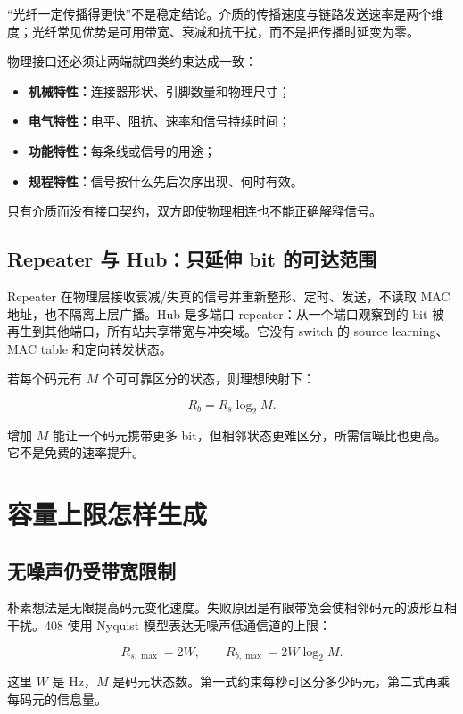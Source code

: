 \documentclass[UTF8,fontset=none,11pt,a4paper]{ctexart}
\providecommand{\tightlist}{\setlength{\itemsep}{0pt}\setlength{\parskip}{0pt}}
\begin{document}
“光纤一定传播得更快”不是稳定结论。介质的传播速度与链路发送速率是两个维度；光纤常见优势是可用带宽、衰减和抗干扰，而不是把传播时延变为零。

物理接口还必须让两端就四类约束达成一致：

\begin{itemize}
\tightlist
\item \textbf{机械特性：}连接器形状、引脚数量和物理尺寸；
\item \textbf{电气特性：}电平、阻抗、速率和信号持续时间；
\item \textbf{功能特性：}每条线或信号的用途；
\item \textbf{规程特性：}信号按什么先后次序出现、何时有效。
\end{itemize}

只有介质而没有接口契约，双方即使物理相连也不能正确解释信号。

\subsection{Repeater 与 Hub：只延伸 bit 的可达范围}

Repeater 在物理层接收衰减/失真的信号并重新整形、定时、发送，不读取 MAC 地址，也不隔离上层广播。Hub 是多端口 repeater：从一个端口观察到的 bit 被再生到其他端口，所有站共享带宽与冲突域。它没有 switch 的 source learning、MAC table 和定向转发状态。

若每个码元有 \(M\) 个可可靠区分的状态，则理想映射下：

\[
R_b=R_s\log_2 M.
\]

增加 \(M\) 能让一个码元携带更多
bit，但相邻状态更难区分，所需信噪比也更高。它不是免费的速率提升。

\section{容量上限怎样生成}\label{3-ux5bb9ux91cfux4e0aux9650ux600eux6837ux751fux6210}

\subsection{无噪声仍受带宽限制}\label{31-ux65e0ux566aux58f0ux4ecdux53d7ux5e26ux5bbdux9650ux5236}

朴素想法是无限提高码元变化速度。失败原因是有限带宽会使相邻码元的波形互相干扰。408
使用 Nyquist 模型表达无噪声低通信道的上限：

\[
R_{s,\max}=2W,
\qquad
R_{b,\max}=2W\log_2M.
\]

这里 \(W\) 是 Hz，\(M\)
是码元状态数。第一式约束每秒可区分多少码元，第二式再乘每码元的信息量。
\end{document}
